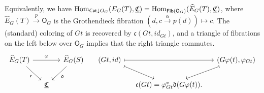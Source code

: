 \documentclass[a4paper,10pt
,draft
]{article}%
\renewcommand{\phi}{\varphi}
\newcommand{\UC}{\underline{\mathfrak C}}
\renewcommand{\1}{\ensuremath{\mathbb{id}}}
\renewcommand{\hat}{\widehat}
\begin{document}
\begin{remark}      
      Equivalently, we have $\Hom_{\Cat \downarrow O_G}(E_G(T), \UC) = \Hom_{\mathsf{Fib} (\mathsf O_G)}(\hat E_G(T), \UC)$,
      where $\hat E_G(T) \xrightarrow{p} \mathsf O_G$ is the Grothendieck fibration
      $(d, c \xrightarrow{\alpha} p(d)) \mapsto c$.
      The (standard) coloring of $G t$ is recovered by $\mathfrak c(G t, id_{G t})$, and
      a triangle of fibrations on the left below over $\mathsf O_G$
      implies that the right triangle commutes.
      \begin{equation}
            \begin{tikzcd}[column sep = small]
                  \hat E_G(T) \arrow[rr, "\phi"] \arrow[dr, "\mathfrak c"']
                  &&
                  \hat E_G(S) \arrow[dl, "\mathfrak d"]
                  &
                  (G t, id) \arrow[rr, mapsto] \arrow[dr, mapsto]
                  &&
                  (G \phi(t), \phi_{G t}) \arrow[dl, mapsto]
                  \\
                  &
                  \UC
                  &
                  &
                  &
                  \mathfrak c(G t) = \phi_{G t}^{\**} \mathfrak d(G \phi(t)).
            \end{tikzcd}
      \end{equation}
\end{remark}
\end{document}
